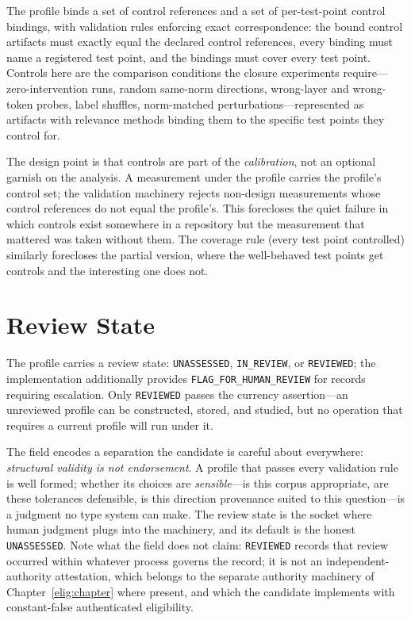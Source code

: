 The profile binds a set of control references and a set of per-test-point
control bindings, with validation rules enforcing exact correspondence: the
bound control artifacts must exactly equal the declared control references,
every binding must name a registered test point, and the bindings must
cover every test point. Controls here are the comparison conditions the
closure experiments require---zero-intervention runs, random same-norm
directions, wrong-layer and wrong-token probes, label shuffles, norm-matched
perturbations---represented as artifacts with relevance methods binding them
to the specific test points they control for.

The design point is that controls are part of the \emph{calibration},
not an optional garnish on the analysis. A measurement under the profile
carries the profile's control set; the validation machinery rejects
non-design measurements whose control references do not equal the profile's.
This forecloses the quiet failure in which controls exist somewhere in a
repository but the measurement that mattered was taken without them. The
coverage rule (every test point controlled) similarly forecloses the partial
version, where the well-behaved test points get controls and the interesting
one does not.

\section{Review State}\label{ch05:review}

The profile carries a review state: \texttt{UNASSESSED}, \texttt{IN\_REVIEW},
or \texttt{REVIEWED}; the implementation additionally provides
\texttt{FLAG\_FOR\_HUMAN\_REVIEW} for records requiring escalation. Only
\texttt{REVIEWED} passes the currency assertion---an unreviewed profile can
be constructed, stored, and studied, but no operation that requires a
current profile will run under it.

The field encodes a separation the candidate is careful about everywhere:
\emph{structural validity is not endorsement}. A profile that passes every
validation rule is well formed; whether its choices are \emph{sensible}---is
this corpus appropriate, are these tolerances defensible, is this direction
provenance suited to this question---is a judgment no type system can make.
The review state is the socket where human judgment plugs into the
machinery, and its default is the honest \texttt{UNASSESSED}. Note what the
field does not claim: \texttt{REVIEWED} records that review occurred within
whatever process governs the record; it is not an independent-authority
attestation, which belongs to the separate authority machinery of
Chapter~\ref{elig:chapter} where present, and which the candidate
implements with constant-false authenticated eligibility.

